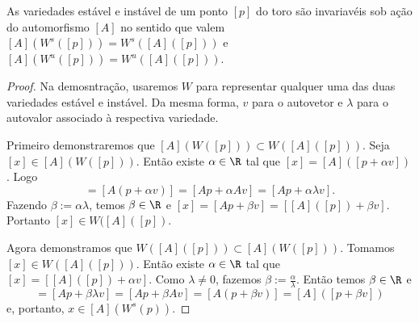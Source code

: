 \begin{proposition}
As variedades estável e instável de um ponto $[p]$ do toro são invariavéis sob ação do automorfismo $[A]$ no sentido que valem $[A](W^s([p])) = W^s([A]([p]))$ e $[A](W^u([p])) = W^u([A]([p]))$.
	\end{proposition}
\begin{proof}
	Na demosntração, usaremos $W$ para representar qualquer uma das duas variedades estável e instável. Da mesma forma, $v$ para o autovetor e $\lambda$ para o autovalor associado à respectiva variedade.

	Primeiro demonstraremos que $[A](W([p])) \subset W([A]([p]))$. Seja $[x] \in [A](W([p]))$. Então existe $\alpha \in \R$ tal que $[x] = [A]([p + \alpha v])$. Logo
	\begin{equation*}
	[x] = [A(p + \alpha v)] = [Ap + \alpha Av] = [Ap + \alpha \lambda v].
	\end{equation*}
Fazendo $\beta := \alpha \lambda$, temos $\beta \in \R$ e $[x] = [Ap + \beta v] = [[A]([p]) + \beta v]$. Portanto $[x] \in W([A]([p])$.

	Agora demonstramos que $W([A]([p])) \subset [A](W([p]))$. Tomamos $[x] \in W([A]([p]))$. Então existe $\alpha \in \R$ tal que $[x] = [[A]([p]) + \alpha v]$. Como $\lambda \neq 0$, fazemos $\beta := \frac{\alpha}{\lambda}$. Então temos $\beta \in \R$ e
	\begin{equation*}
	[x] = [Ap + \beta \lambda v] = [Ap + \beta Av] = [A(p + \beta v)] = [A]([p + \beta v])
		\end{equation*}
e, portanto, $x \in [A](W^s(p))$.
	\end{proof}


